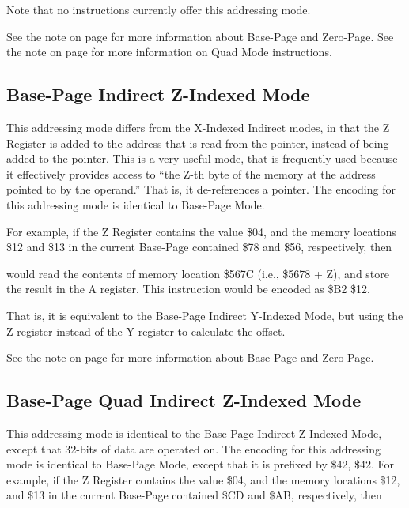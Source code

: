 Note that no instructions currently offer this addressing mode.

See the note on page \pageref{Base-Page (Zero-Page) Mode} for more information about Base-Page and Zero-Page.
See the note on page \pageref{Base-Page (Zero-Page) Quad Mode} for more information on Quad Mode instructions.
\fi

\subsection{Base-Page Indirect Z-Indexed Mode}

This addressing mode differs from the X-Indexed Indirect modes, in that the Z Register is
added to the address that is read from the pointer, instead of being added to the pointer.
This is a very useful mode, that is frequently used because it effectively provides access to
``the Z-th byte of the memory at the address pointed to by the operand.'' That is, it de-references
a pointer.
The encoding for this addressing mode is identical to Base-Page Mode.

For example, if the Z Register contains the value \$04, and the memory locations \$12 and \$13 in the current
Base-Page contained \$78 and \$56, respectively,
then


would read the contents of memory location \$567C (i.e., \$5678 + Z),
and store the result in the A register. This instruction would be encoded as \$B2 \$12.

That is, it is equivalent to the Base-Page Indirect Y-Indexed Mode, but using the Z register instead
of the Y register to calculate the offset.

See the note on page \pageref{Base-Page (Zero-Page) Mode} for more information about Base-Page and Zero-Page.

\subsection{Base-Page Quad Indirect Z-Indexed Mode}

This addressing mode is identical to the Base-Page Indirect Z-Indexed Mode, except that
32-bits of data are operated on. The encoding for this addressing mode is identical to
Base-Page Mode, except that it is prefixed by \$42, \$42.
For example, if the Z Register contains the value \$04, and the memory locations \$12, and \$13 in the current
Base-Page contained \$CD and \$AB, respectively,
then

